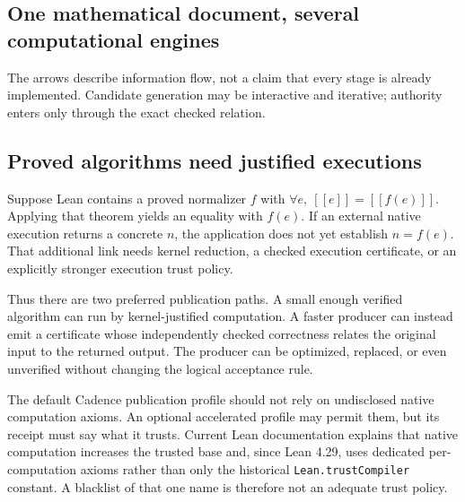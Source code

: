 \documentclass[11pt,letterpaper]{article}
\newcommand{\code}[1]{\nolinkurl{#1}}
\newcommand{\sem}[1]{[\![#1]\!]}
\theoremstyle{definition}
\begin{document}
\subsection{One mathematical document, several computational engines}
\begin{center}
\end{center}
The arrows describe information flow, not a claim that every stage is already
implemented. Candidate generation may be interactive and iterative; authority
enters only through the exact checked relation.

\subsection{Proved algorithms need justified executions}
Suppose Lean contains a proved normalizer \(f\) with
\(\forall e,\ \sem e=\sem{f(e)}\). Applying that theorem yields an equality with
\(f(e)\). If an external native execution returns a concrete \(n\), the application
does not yet establish \(n=f(e)\). That additional link needs kernel reduction,
a checked execution certificate, or an explicitly stronger execution trust policy.

Thus there are two preferred publication paths. A small enough verified algorithm
can run by kernel-justified computation. A faster producer can instead emit a
certificate whose independently checked correctness relates the original input
to the returned output. The producer can be optimized, replaced, or even
unverified without changing the logical acceptance rule.

The default Cadence publication profile should not rely on undisclosed native
computation axioms. An optional accelerated profile may permit them, but its
receipt must say what it trusts. Current Lean documentation explains that native
computation increases the trusted base and, since Lean 4.29, uses dedicated
per-computation axioms rather than only the historical \code{Lean.trustCompiler}
constant\cite{leanvalidation}. A blacklist of that one name is therefore not an
adequate trust policy.
\end{document}
